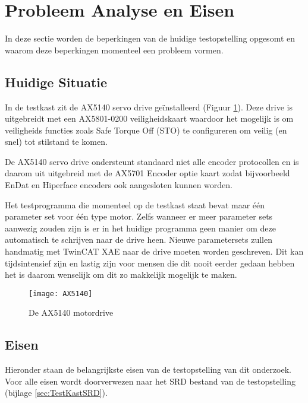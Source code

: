\section{Probleem Analyse en Eisen} \label{sec:ProbleemAnalyseEnEisen}

In deze sectie worden de beperkingen van de huidige testopstelling opgesomt en waarom deze beperkingen momenteel een probleem vormen.

\subsection{Huidige Situatie}

In de testkast zit de \gls{AX5140} \cite{web:AX5140Drive} servo drive geïnstalleerd (Figuur \ref{fig:AX5140}). Deze drive is uitgebreidt met een \gls{AX5801}-0200 \cite{web:AX5801} veiligheidskaart waardoor het mogelijk is om veiligheids functies zoals Safe Torque Off (\gls{STO}) te configureren om veilig (en snel) tot stilstand te komen.

\vspace{0.5cm}

De \gls{AX5140} servo drive ondersteunt standaard niet alle encoder protocollen en is daarom uit uitgebreid met de \gls{AX5701} \cite{web:AX5701} Encoder optie kaart zodat bijvoorbeeld EnDat en Hiperface encoders ook aangesloten kunnen worden.

\vspace{0.5cm}

Het testprogramma die momenteel op de testkast staat bevat maar één parameter set voor één type motor. Zelfs wanneer er meer parameter sets aanwezig zouden zijn is er in het huidige programma geen manier om deze automatisch te schrijven naar de drive heen. Nieuwe parametersets zullen handmatig met \gls{TwinCAT} XAE \cite{web:DriveManager2} naar de drive moeten worden geschreven. Dit kan tijdsintensief zijn en lastig zijn voor mensen die dit nooit eerder gedaan hebben het is daarom wenselijk om dit zo makkelijk mogelijk te maken.

\begin{figure}[h]
	\centering
	\texttt{[image: AX5140]}
	\label{fig:AX5140}
	\caption{De \gls{AX5140} motordrive \cite{web:AX5140Drive}}
\end{figure}

\newpage

\subsection{Eisen}

Hieronder staan de belangrijkste eisen van de testopstelling van dit onderzoek. Voor alle eisen wordt doorverwezen naar het SRD bestand van de testopstelling (bijlage \ref{sec:TestKastSRD}).








